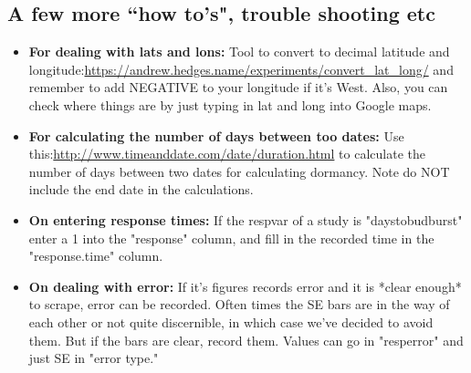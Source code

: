 \documentclass{article}[12pt]
\begin{document}
\subsection*{A few more ``how to's", trouble shooting etc} 
 \begin{itemize}
 \item \textbf{For dealing with lats and lons:} Tool to convert to decimal latitude and longitude:\url{https://andrew.hedges.name/experiments/convert_lat_long/}  and remember to add NEGATIVE to your longitude if it's West. Also, you can check where things are by just typing in lat and long into Google maps.
\item \textbf{ For calculating the number of days between too dates:} Use this:\url{http://www.timeanddate.com/date/duration.html} to calculate the number of days between two dates for calculating dormancy. Note do NOT include the end date in the calculations.
\item \textbf{On entering response times:} If the respvar of a study is "daystobudburst" enter a 1 into the "response" column, and fill in the recorded time in the "response.time" column.
\item \textbf{On dealing with error:} If it's figures records error and it is *clear enough* to scrape, error can be recorded. Often times the SE bars are in the way of each other or not quite discernible, in which case we've decided to avoid them. But if the bars are clear, record them. Values can go in "resp\textundersccore error" and just SE in "error type."
\end{itemize}
\end{document}
